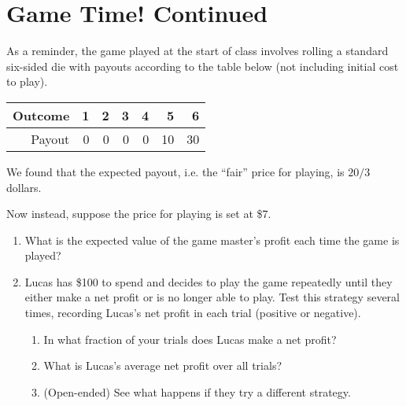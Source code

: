 \documentclass{article}
\begin{document}
\section*{Game Time! Continued}

As a reminder, the game played at the start of class involves rolling a standard six-sided die with payouts according to the table below (not including initial cost to play).
\begin{table}[H]
\centering
\begin{tabular}{r||r|r|r|r|r|r}
Outcome & 1 & 2 & 3 & 4 & 5 & 6 \\ \hline 
Payout & 0 & 0 & 0 & 0 & 10 & 30
\end{tabular}
\end{table}
We found that the expected payout, i.e. the ``fair'' price for playing, is $20/3$ dollars.

Now instead, suppose the price for playing is set at \$7.

\begin{enumerate}
\item What is the expected value of the game master's profit each time the game is played?\vspace{1cm}
\item Lucas has \$100 to spend and decides to play the game repeatedly until they either make a net profit or is no longer able to play. Test this strategy several times, recording Lucas's net profit in each trial (positive or negative).\vspace{8cm}
\begin{enumerate}
\item In what fraction of your trials does Lucas make a net profit?\vspace{1cm}
\item What is Lucas's average net profit over all trials?\vspace{1cm}
\item (Open-ended) See what happens if they try a different strategy.
\end{enumerate}
\end{enumerate} 



\end{document}
